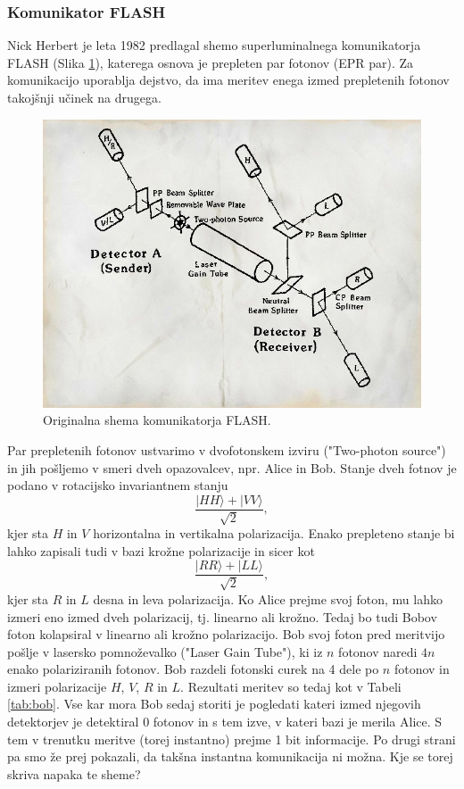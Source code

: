 \documentclass[12pt]{article}
\begin{document}
\subsubsection{Komunikator FLASH}

\par Nick Herbert je leta 1982 predlagal shemo superluminalnega komunikatorja FLASH (Slika \ref{fig:flash}), katerega osnova je prepleten par fotonov (EPR par). Za komunikacijo uporablja dejstvo, da ima meritev enega izmed prepletenih fotonov takojšnji učinek na drugega.

\begin{figure}[H]
\includegraphics[width=12cm]{flash.jpg}
\centering
\caption{Originalna shema komunikatorja FLASH. \cite{herbertFLASHSuperluminalCommunicator1982}}
\label{fig:flash}
\end{figure}
\par Par prepletenih fotonov ustvarimo v dvofotonskem izviru ("Two-photon source") in jih pošljemo v smeri dveh opazovalcev, npr. Alice in Bob. Stanje dveh fotnov je podano v rotacijsko invariantnem stanju
\begin{equation}
\frac{| HH \rangle + | VV \rangle}{\sqrt{2}},
\end{equation}
kjer sta $H$ in $V$ horizontalna in vertikalna polarizacija. Enako prepleteno stanje bi lahko zapisali tudi v bazi krožne polarizacije in sicer kot
\begin{equation}
\frac{| RR \rangle + | LL \rangle}{\sqrt{2}},
\end{equation}
kjer sta $R$ in $L$ desna in leva polarizacija. Ko Alice prejme svoj foton, mu lahko izmeri eno izmed dveh polarizacij, tj. linearno ali krožno. Tedaj bo tudi Bobov foton kolapsiral v linearno ali krožno polarizacijo. Bob svoj foton pred meritvijo pošlje v lasersko pomnoževalko ("Laser Gain Tube"), ki iz $n$ fotonov naredi $4n$ enako polariziranih fotonov. Bob razdeli fotonski curek na 4 dele po $n$ fotonov in izmeri polarizacije $H$, $V$, $R$ in $L$. Rezultati meritev so tedaj kot v Tabeli \ref{tab:bob}. Vse kar mora Bob sedaj storiti je pogledati kateri izmed njegovih detektorjev je detektiral 0 fotonov in s tem izve, v kateri bazi je merila Alice. S tem v trenutku meritve (torej instantno) prejme 1 bit informacije. Po drugi strani pa smo že prej pokazali, da takšna instantna komunikacija ni možna. Kje se torej skriva napaka te sheme? \cite{marcocerezoEntangledParticlesFaster2015}
\end{document}
